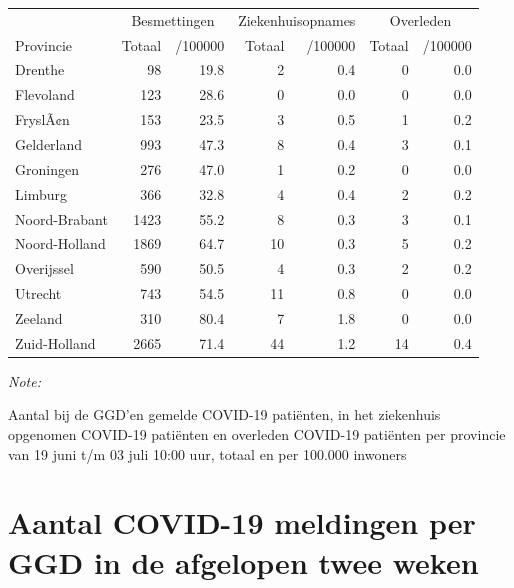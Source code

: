 \documentclass[
  english,
  man,floatsintext]{apa6}
\begin{document}
\begin{table}
\centering
\begin{threeparttable}
\begin{tabular}{lrrrrrr}
\toprule
\multicolumn{1}{c}{ } & \multicolumn{2}{c}{Besmettingen} & \multicolumn{2}{c}{Ziekenhuisopnames} & \multicolumn{2}{c}{Overleden} \\
\cmidrule(l{3pt}r{3pt}){2-3} \cmidrule(l{3pt}r{3pt}){4-5} \cmidrule(l{3pt}r{3pt}){6-7}
Provincie & Totaal & /100000 & Totaal & /100000 & Totaal & /100000\\
\midrule
Drenthe & 98 & 19.8 & 2 & 0.4 & 0 & 0.0\\
Flevoland & 123 & 28.6 & 0 & 0.0 & 0 & 0.0\\
FryslÃ¢n & 153 & 23.5 & 3 & 0.5 & 1 & 0.2\\
Gelderland & 993 & 47.3 & 8 & 0.4 & 3 & 0.1\\
Groningen & 276 & 47.0 & 1 & 0.2 & 0 & 0.0\\
Limburg & 366 & 32.8 & 4 & 0.4 & 2 & 0.2\\
Noord-Brabant & 1423 & 55.2 & 8 & 0.3 & 3 & 0.1\\
Noord-Holland & 1869 & 64.7 & 10 & 0.3 & 5 & 0.2\\
Overijssel & 590 & 50.5 & 4 & 0.3 & 2 & 0.2\\
Utrecht & 743 & 54.5 & 11 & 0.8 & 0 & 0.0\\
Zeeland & 310 & 80.4 & 7 & 1.8 & 0 & 0.0\\
Zuid-Holland & 2665 & 71.4 & 44 & 1.2 & 14 & 0.4\\
\bottomrule
\end{tabular}
\begin{tablenotes}
\item \textit{Note: } 
\item Aantal bij de GGD’en gemelde COVID-19 patiënten, in het ziekenhuis opgenomen COVID-19 patiënten en overleden COVID-19 patiënten per provincie van 19 juni t/m 03 juli 10:00 uur, totaal en per 100.000 inwoners
\end{tablenotes}
\end{threeparttable}
\end{table}

\newpage

\hypertarget{aantal-covid-19-meldingen-per-ggd-in-de-afgelopen-twee-weken}{%
\section{Aantal COVID-19 meldingen per GGD in de afgelopen twee weken}\label{aantal-covid-19-meldingen-per-ggd-in-de-afgelopen-twee-weken}}
\end{document}
